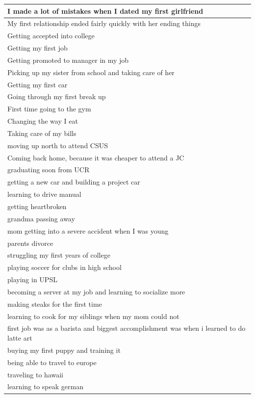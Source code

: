 \documentclass[
  .7em,
  letterpaper,
  DIV=11,
  numbers=noendperiod]{scrartcl}
\begin{document}
\begin{table}
\begin{tabular}{l}
\hline
I made a lot of mistakes when I dated my first girlfriend\\
\hline
My first relationship ended fairly quickly with her ending things\\
\hline
Getting accepted into college\\
\hline
Getting my first job\\
\hline
Getting promoted to manager in my job\\
\hline
Picking up my sister from school and taking care of her\\
\hline
Getting my first car\\
\hline
Going through my first break up\\
\hline
First time going to the gym\\
\hline
Changing the way I eat\\
\hline
Taking care of my bills\\
\hline
moving up north to attend CSUS\\
\hline
Coming back home, because it was cheaper to attend a JC\\
\hline
graduating soon from UCR\\
\hline
getting a new car and building a project car\\
\hline
learning to drive manual\\
\hline
getting heartbroken\\
\hline
grandma passing away\\
\hline
mom getting into a severe accident when I was young\\
\hline
parents divorce\\
\hline
struggling my first years of college\\
\hline
playing soccer for clubs in high school\\
\hline
playing in UPSL\\
\hline
becoming a server at my job and learning to socialize more\\
\hline
making steaks for the first time\\
\hline
learning to cook for my siblings when my mom could not\\
\hline
first job was as a barista and biggest accomplishment was when i learned to do latte art\\
\hline
buying my first puppy and training it\\
\hline
being able to travel to europe\\
\hline
traveling to hawaii\\
\hline
learning to speak german\\

\end{tabular}
\end{table}
\end{document}
